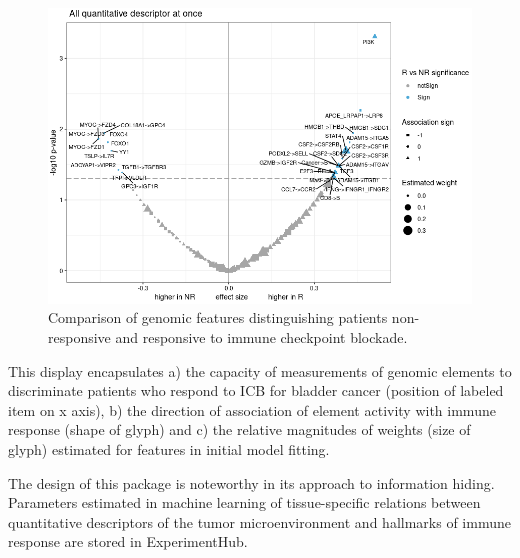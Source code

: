 \begin{figure}
\includegraphics[width=0.95\linewidth,]{easierFinal} \caption{Comparison of genomic features distinguishing patients non-responsive and responsive to immune checkpoint blockade.}\label{fig:easfin}
\end{figure}

This display encapsulates a) the capacity of measurements of
genomic elements to discriminate patients who respond
to ICB for bladder cancer (position of labeled
item on x axis), b) the direction of association of
element activity with immune response (shape of glyph) and c) the
relative magnitudes of weights (size of glyph) estimated for features in
initial model fitting.

The design of this package is noteworthy in its approach
to information hiding. Parameters estimated in machine
learning of tissue-specific relations between quantitative
descriptors of the tumor microenvironment and hallmarks
of immune response are stored in ExperimentHub.

\begin{Shaded}
\begin{Highlighting}[]
\NormalTok{()}
\end{Highlighting}
\end{Shaded}

